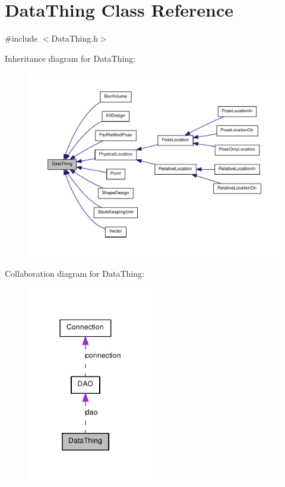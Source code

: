 \hypertarget{class_data_thing}{
\section{DataThing Class Reference}
\label{class_data_thing}
}


{\ttfamily \#include $<$DataThing.h$>$}



Inheritance diagram for DataThing:\nopagebreak
\begin{figure}[H]
\begin{center}
\leavevmode
\includegraphics[width=400pt]{class_data_thing__inherit__graph}
\end{center}
\end{figure}


Collaboration diagram for DataThing:\nopagebreak
\begin{figure}[H]
\begin{center}
\leavevmode
\includegraphics[width=158pt]{class_data_thing__coll__graph}
\end{center}
\end{figure}
